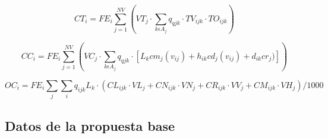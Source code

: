 \documentclass[letterpaper,12pt]{article}
\begin{document}
\begin{equation}
    CT_i = FE_i \sum_{j=1}^{NV} (VT_j \cdot \sum_{k \epsilon A_j} q_{qjk} \cdot TV_{ijk} \cdot TO_{ijk})
\end{equation}

\begin{equation}
    CC_i = FE_i \sum_{j=1}^{NV} (VC_j \cdot \sum_{k \epsilon A_j} q_{qjk} \cdot [L_k cm_j(v_{ij})+h_{ik} cd_j(v_{ij})+ d_{ik}cr_j)])
\end{equation}

\begin{equation}
    OC_i = FE_i \sum_{j}\sum_{i} q_{ijk} L_k \cdot (CL_{ijk} \cdot VL_j + CN_{ijk} \cdot VN_j + CR_{ijk} \cdot VV_j+ CM_{ijk} \cdot VH_j) /1000
\end{equation}


\subsection{Datos de la propuesta base}
\end{document}
